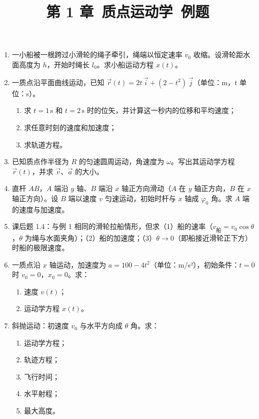 \documentclass[12pt]{article}
\title{第 1 章\ 质点运动学\ 例题}
\author{}
\date{}
\begin{document}
\maketitle

\begin{enumerate}[label=\textbf{例\arabic*.}, leftmargin=*]

\item 一小船被一根跨过小滑轮的绳子牵引，绳端以恒定速率 $v_0$ 收缩。设滑轮距水面高度为 $h$，开始时绳长 $l_0$。求小船运动方程 $x(t)$。

\item 一质点沿平面曲线运动，已知 $\vec{r}(t) = 2t\,\vec{i} + (2 - t^2)\,\vec{j}$（单位：m，$t$ 单位：s）。
\begin{enumerate}[label=(\arabic*)]
  \item 求 $t = 1\,\mathrm{s}$ 和 $t = 2\,\mathrm{s}$ 时的位矢，并计算这一秒内的位移和平均速度；
  \item 求任意时刻的速度和加速度；
  \item 求轨道方程。
\end{enumerate}

\item 已知质点作半径为 $R$ 的匀速圆周运动，角速度为 $\omega$。写出其运动学方程 $\vec{r}(t)$，并求 $\vec{v}$、$\vec{a}$ 的大小。

\item 直杆 $AB$，$A$ 端沿 $y$ 轴、$B$ 端沿 $x$ 轴正方向滑动（$A$ 在 $y$ 轴正方向，$B$ 在 $x$ 轴正方向）。设 $B$ 端以速度 $v$ 匀速运动，初始时杆与 $x$ 轴成 $\varphi_0$ 角。求 $A$ 端的速度与加速度。

\item 课后题 1.4：与例 1 相同的滑轮拉船情形，但求（1）船的速率（$v_{\text{船}}=v_0\cos\theta$，$\theta$ 为绳与水面夹角）；（2）船的加速度；（3）$\theta \to 0$（即船接近滑轮正下方）时船的极限速度。

\item 一质点沿 $x$ 轴运动，加速度为 $a = 100 - 4t^2$（单位：m/s²），初始条件：$t=0$ 时 $v_0=0$，$x_0=0$。求：
\begin{enumerate}[label=(\arabic*)]
  \item 速度 $v(t)$；
  \item 运动学方程 $x(t)$。
\end{enumerate}

\item 斜抛运动：初速度 $v_0$ 与水平方向成 $\theta$ 角。求：
\begin{enumerate}[label=(\arabic*)]
  \item 运动学方程；
  \item 轨迹方程；
  \item 飞行时间；
  \item 水平射程；
  \item 最大高度。
\end{enumerate}


\end{enumerate}
\end{document}
